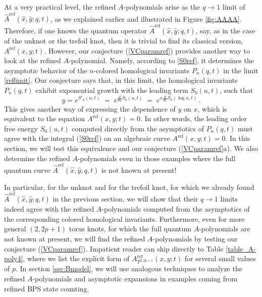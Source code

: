 \documentclass[hyper,letterpaper]{JHEP3}
\newcommand{\be}{\begin{equation}}
\newcommand{\ee}{\end{equation}}
\renewcommand{\hat}{\widehat}
\begin{document}
At a very practical level,
the refined $A$-polynomials arise as the $q \to 1$ limit of $\widehat{A}^{\text{ref}}(\hat{x},\hat{y};q,t)$,
as we explained earlier and illustrated in Figure \ref{fig:AAAA}.
Therefore, if one knows the quantum operator $\widehat{A}^{\text{ref}}(\hat{x},\hat{y};q,t)$,
say, as in the case of the unknot or the trefoil knot, then it is trivial to find its classical version, $A^{\text{ref}}(x,y;t)$.
However, our conjecture (\ref{VCparamref}) provides another way to look at the refined $A$-polynomial.
Namely, according to \eqref{S0ref}, it determines the asymptotic behavior of the $n$-colored homological invariants $P_n (q,t)$
in the limit \eqref{reflimit}.
Our conjecture says that, in this limit, the homological invariants $P_n (q,t)$ exhibit exponential growth with the leading term $S_0(u,t)$,
such that
\be
y = e^{S'_0(u,t)} \; = \; e^{\frac{d}{du} S_0(u,t)} \; = \; e^{x \frac{d}{dx} S_0(\log x,t)} \,.   \label{yS0prim}
\ee
This gives another way of expressing the dependence of $y$ on $x$, which is equivalent to the equation $A^{\text{ref}}(x,y;t)=0$.
In other words, the leading order free energy $S_0(u,t)$ computed directly from the asymptotics of $P_n (q,t)$
must agree with the integral (\ref{S0ref}) on an algebraic curve $A^{\text{ref}}(x,y;t) = 0$.
In this section, we will test this equivalence and our conjecture (\ref{VCparamref}a).
We also determine the refined $A$-polynomials even in those examples
where the full quantum curve $\widehat{A}^{\text{ref}}(\hat{x},\hat{y};q,t)$ is not known at present!

In particular, for the unknot and for the trefoil knot, for which we already found
$\widehat{A}^{\text{ref}}(\hat{x},\hat{y};q,t)$ in the previous section,
we will show that their $q \to 1$ limits indeed agree with the refined $A$-polynomials
computed from the asymptotics of the corresponding colored homological invariants.
Furthermore, even for more general $(2,2p+1)$ torus knots, for which the full quantum $A$-polynomials are not known at present,
we will find the refined $A$-polynomials by testing our conjecture (\ref{VCparamref}).
Impatient reader can skip directly to Table \ref{table_A-poly4},
where we list the explicit form of $A^{\text{ref}}_{T^{2,2p+1}} (x,y;t)$ for several small values of $p$.
In section \ref{sec:Bmodel}, we will use analogous techniques to analyze
the refined $A$-polynomials and asymptotic expansions in examples coming from refined BPS state counting.

\end{document}
